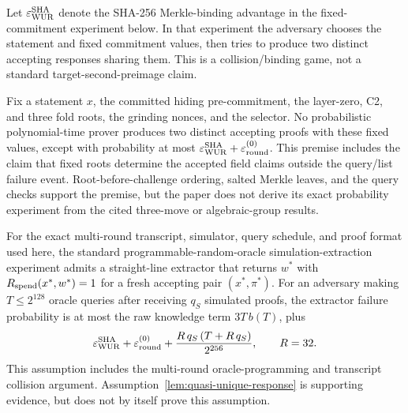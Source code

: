 Let \(\varepsilon_{\rm WUR}^{\rm SHA}\) denote the SHA-256 Merkle-binding
advantage in the fixed-commitment experiment below.  In that experiment the
adversary chooses the statement and fixed commitment values, then tries to
produce two distinct accepting responses sharing them.  This is a
collision/binding game, not a standard target-second-preimage claim.

\begin{assumption}
\label{lem:quasi-unique-response}
Fix a statement \(x\), the committed hiding pre-commitment, the layer-zero,
C2, and three fold roots, the grinding nonces, and the selector.  No
probabilistic polynomial-time prover produces two distinct accepting proofs
with these fixed values, except with probability at most
\(\varepsilon_{\rm WUR}^{\rm SHA}
  +\varepsilon_{\rm round}^{(0)}\).
This premise includes the claim that fixed roots determine the accepted field
claims outside the query/list failure event.  Root-before-challenge ordering,
salted Merkle leaves, and the query checks support the premise, but the paper
does not derive its exact probability experiment from the cited three-move or
algebraic-group results.
\end{assumption}

\begin{assumption}
\label{ass:exact-sim-extraction}
For the exact multi-round transcript, simulator, query schedule, and proof
format used here, the standard programmable-random-oracle simulation-extraction
experiment admits a straight-line extractor that returns \(w^\ast\) with
\(R_{\mathrm{spend}}(x^\ast,w^\ast)=1\) for a fresh accepting pair
\((x^\ast,\pi^\ast)\).  For
an adversary making \(T\le2^{128}\) oracle queries after receiving \(q_S\)
simulated proofs, the extractor failure probability is at most the raw
knowledge term \(3T\,b(T)\), plus
\[
 \varepsilon_{\rm WUR}^{\rm SHA}+\varepsilon_{\rm round}^{(0)}
 +\frac{R\,q_S\,(T+R\,q_S)}{2^{256}},
 \qquad R=32 .
\]
This assumption includes the multi-round oracle-programming and transcript
collision argument.  Assumption~\ref{lem:quasi-unique-response} is supporting
evidence, but does not by itself prove this assumption.
\end{assumption}

